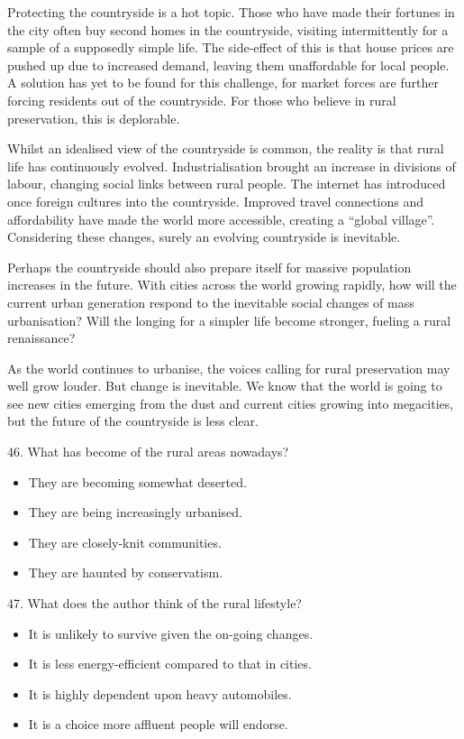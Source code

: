 \documentclass[UTF8,11pt]{ctexart}
\begin{document}
Protecting the countryside is a hot topic. Those who have made their fortunes in the city often buy second homes in the countryside, visiting intermittently for a sample of a supposedly simple life. The side-effect of this is that house prices are pushed up due to increased demand, leaving them unaffordable for local people. A solution has yet to be found for this challenge, for market forces are further forcing residents out of the countryside. For those who believe in rural preservation, this is deplorable.


Whilst an idealised view of the countryside is common, the reality is that rural life has continuously evolved. Industrialisation brought an increase in divisions of labour, changing social links between rural people. The internet has introduced once foreign cultures into the countryside. Improved travel connections and affordability have made the world more accessible, creating a “global village”. Considering these changes, surely an evolving countryside is inevitable.


Perhaps the countryside should also prepare itself for massive population increases in the future. With cities across the world growing rapidly, how will the current urban generation respond to the inevitable social changes of mass urbanisation? Will the longing for a simpler life become stronger, fueling a rural renaissance?


As the world continues to urbanise, the voices calling for rural preservation may well grow louder. But change is inevitable. We know that the world is going to see new cities emerging from the dust and current cities growing into megacities, but the future of the countryside is less clear.


46. What has become of the rural areas nowadays?


\begin{itemize}[leftmargin=2em,itemsep=.2em,topsep=.4em]\item[A.] They are becoming somewhat deserted.
\item[B.] They are being increasingly urbanised.
\item[C.] They are closely-knit communities.
\item[D.] They are haunted by conservatism.
\end{itemize}

47. What does the author think of the rural lifestyle?


\begin{itemize}[leftmargin=2em,itemsep=.2em,topsep=.4em]\item[A.] It is unlikely to survive given the on-going changes.
\item[B.] It is less energy-efficient compared to that in cities.
\item[C.] It is highly dependent upon heavy automobiles.
\item[D.] It is a choice more affluent people will endorse.
\end{itemize}
\end{document}
